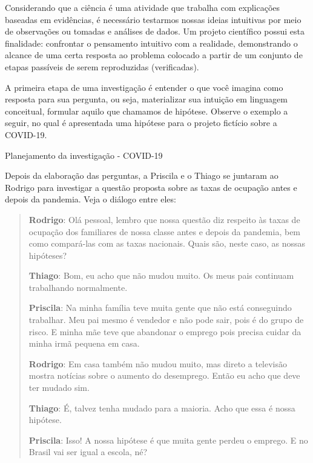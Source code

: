 Considerando que a ciência é uma atividade que trabalha com explicações baseadas em evidências, é necessário testarmos nossas ideias intuitivas por meio de observações ou tomadas e análises de dados. Um projeto científico possui esta finalidade: confrontar o pensamento intuitivo com a realidade, demonstrando o alcance de uma certa resposta ao problema colocado a partir de um conjunto de etapas passíveis de serem reproduzidas (verificadas).

A primeira etapa de uma investigação é entender o que você imagina  como resposta para sua pergunta, ou seja, materializar sua intuição em linguagem conceitual, formular aquilo que chamamos de hipótese. Observe o exemplo a seguir, no qual é apresentada uma hipótese para o projeto fictício sobre a COVID-19.


\begin{example}{Planejamento da investigação - COVID-19}

Depois da elaboração das perguntas, a Priscila e o Thiago se juntaram ao Rodrigo para investigar a questão proposta sobre as taxas de ocupação antes e depois da pandemia. Veja o diálogo entre eles:

\begin{quote}
\textbf{Rodrigo}: Olá pessoal, lembro que nossa questão diz respeito às taxas de ocupação dos familiares de nossa classe antes e depois da pandemia, bem como compará-las com as taxas nacionais. Quais são, neste caso, as nossas hipóteses?

\textbf{Thiago}: Bom, eu acho que não mudou muito. Os meus pais continuam trabalhando normalmente.

\textbf{Priscila}: Na minha família teve muita gente que não está conseguindo trabalhar. Meu pai mesmo é vendedor e não pode sair, pois é do grupo de risco. E minha mãe teve que abandonar o emprego pois precisa cuidar da minha irmã pequena em casa.

\textbf{Rodrigo}: Em casa também não mudou muito, mas direto a televisão mostra notícias sobre o aumento do desemprego. Então eu acho que deve ter mudado sim.

\textbf{Thiago}: É, talvez tenha mudado para a maioria. Acho que essa é nossa hipótese.

\textbf{Priscila}: Isso! A nossa hipótese é que muita gente perdeu o emprego. E no Brasil vai ser igual a escola, né?
\end{quote}

\end{example}


